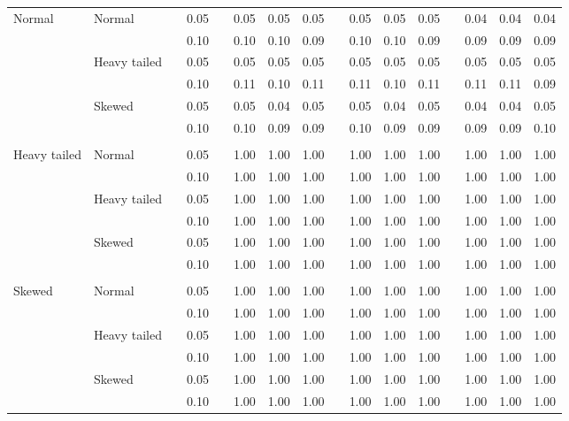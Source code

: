 \begin{table}[ht]
\begin{scriptsize}
\begin{center}
\begin{tabular}{ll p{.1cm} c p{.1cm} rrr p{.1cm} rrr p{.1cm} rrr}
\rowcolor{gray!20} Normal       & Normal       && 0.05 &&  0.05 & 0.05 & 0.05 && 0.05 & 0.05 & 0.05 && 0.04 & 0.04 & 0.04 \\ 
\rowcolor{gray!20}              &              && 0.10 &&  0.10 & 0.10 & 0.09 && 0.10 & 0.10 & 0.09 && 0.09 & 0.09 & 0.09 \\ 
\rowcolor{gray!20}              & Heavy tailed && 0.05 &&  0.05 & 0.05 & 0.05 && 0.05 & 0.05 & 0.05 && 0.05 & 0.05 & 0.05 \\ 
\rowcolor{gray!20}              &              && 0.10 &&  0.11 & 0.10 & 0.11 && 0.11 & 0.10 & 0.11 && 0.11 & 0.11 & 0.09 \\ 
\rowcolor{gray!20}              & Skewed       && 0.05 &&  0.05 & 0.04 & 0.05 && 0.05 & 0.04 & 0.05 && 0.04 & 0.04 & 0.05 \\ 
\rowcolor{gray!20}              &              && 0.10 &&  0.10 & 0.09 & 0.09 && 0.10 & 0.09 & 0.09 && 0.09 & 0.09 & 0.10 \\
              &&&&&&&&&&&&&&&\\  
 Heavy tailed & Normal       && 0.05 &&  1.00 & 1.00 & 1.00 && 1.00 & 1.00 & 1.00 && 1.00 & 1.00 & 1.00 \\ 
              &              && 0.10 &&  1.00 & 1.00 & 1.00 && 1.00 & 1.00 & 1.00 && 1.00 & 1.00 & 1.00 \\ 
              & Heavy tailed && 0.05 &&  1.00 & 1.00 & 1.00 && 1.00 & 1.00 & 1.00 && 1.00 & 1.00 & 1.00 \\ 
              &              && 0.10 &&  1.00 & 1.00 & 1.00 && 1.00 & 1.00 & 1.00 && 1.00 & 1.00 & 1.00 \\ 
              & Skewed       && 0.05 &&  1.00 & 1.00 & 1.00 && 1.00 & 1.00 & 1.00 && 1.00 & 1.00 & 1.00 \\ 
              &              && 0.10 &&  1.00 & 1.00 & 1.00 && 1.00 & 1.00 & 1.00 && 1.00 & 1.00 & 1.00 \\ 
              &&&&&&&&&&&&&&&\\ 
 Skewed       & Normal       && 0.05 &&  1.00 & 1.00 & 1.00 && 1.00 & 1.00 & 1.00 && 1.00 & 1.00 & 1.00 \\ 
              &              && 0.10 &&  1.00 & 1.00 & 1.00 && 1.00 & 1.00 & 1.00 && 1.00 & 1.00 & 1.00 \\ 
              & Heavy tailed && 0.05 &&  1.00 & 1.00 & 1.00 && 1.00 & 1.00 & 1.00 && 1.00 & 1.00 & 1.00 \\ 
              &              && 0.10 &&  1.00 & 1.00 & 1.00 && 1.00 & 1.00 & 1.00 && 1.00 & 1.00 & 1.00 \\ 
              & Skewed       && 0.05 &&  1.00 & 1.00 & 1.00 && 1.00 & 1.00 & 1.00 && 1.00 & 1.00 & 1.00 \\ 
              &              && 0.10 &&  1.00 & 1.00 & 1.00 && 1.00 & 1.00 & 1.00 && 1.00 & 1.00 & 1.00 \\ 


\end{tabular}
\end{center}
\end{scriptsize}
\end{table}
